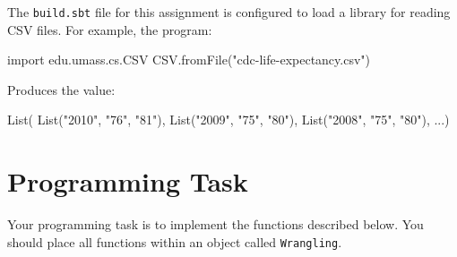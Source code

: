 \documentclass[9pt]{extbook}
\begin{document}
The \texttt{build.sbt} file for this assignment is
configured to load a library for reading CSV files. For example, the program:
\begin{scalacode}
import edu.umass.cs.CSV
CSV.fromFile("cdc-life-expectancy.csv")
\end{scalacode}
Produces the value:
\begin{scalacode}
List(
  List("2010", "76", "81"),
  List("2009", "75", "80"),
  List("2008", "75", "80"),
  ...)
\end{scalacode}

\section{Programming Task}

Your programming task is to implement the functions described below.
You should place all functions within an object called \texttt{Wrangling}.
\end{document}
